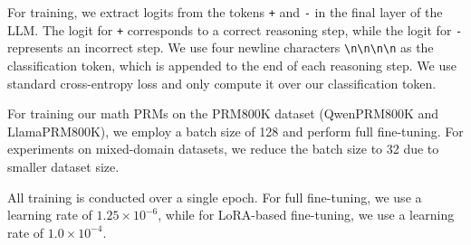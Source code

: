 For training, we extract logits from the tokens \texttt{+} and \texttt{-} in the final layer of the LLM. The logit for \texttt{+} corresponds to a correct reasoning step, while the logit for \texttt{-} represents an incorrect step. We use four newline characters \texttt{\textbackslash n\textbackslash n\textbackslash n\textbackslash n} as the classification token, which is appended to the end of each reasoning step. We use standard cross-entropy loss and only compute it over our classification token.

For training our math PRMs on the PRM800K dataset (QwenPRM800K and LlamaPRM800K),
we employ a batch size of 128 and perform full fine-tuning. For experiments on mixed-domain datasets, we reduce the batch size to 32 due to smaller dataset size.

All training is conducted over a single epoch. For full fine-tuning, we use a learning rate of $1.25 \times 10^{-6}$, while for LoRA-based fine-tuning, we use a learning rate of $1.0 \times 10^{-4}$.


\clearpage